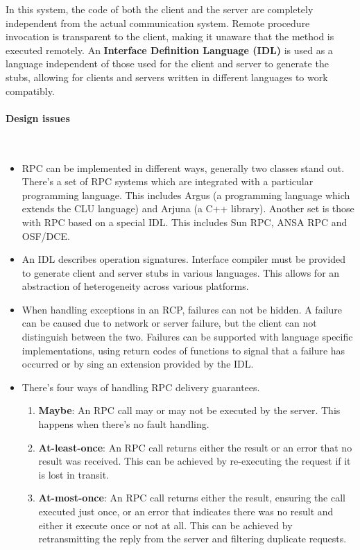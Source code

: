 \documentclass[a4paper]{article}
\newcommand{\subsubsubsection}[1]{\paragraph{#1}\mbox{}\\}
\begin{document}
In this system, the code of both the client and the server are completely independent from the actual communication system. Remote procedure invocation is transparent to the client, making it unaware that the method is executed remotely. An \textbf{Interface Definition Language (IDL)} is used as a language independent of those used for the client and server to generate the stubs, allowing for clients and servers written in different languages to work compatibly.

\subsubsubsection{Design issues}

\label{sec:delivery_guarantees}

\begin{itemize}
\item RPC can be implemented in different ways, generally two classes stand out. There's a set of RPC systems which are integrated with a particular programming language. This includes Argus (a programming language which extends the CLU language) and Arjuna (a C++ library). Another set is those with RPC based on a special IDL. This includes Sun RPC, ANSA RPC and OSF/DCE.
\item An IDL describes operation signatures. Interface compiler must be provided to generate client and server stubs in various languages. This allows for an abstraction of heterogeneity across various platforms.
\item When handling exceptions in an RCP, failures can not be hidden. A failure can be caused due to network or server failure, but the client can not distinguish between the two. Failures can be supported with language specific implementations, using return codes of functions to signal that a failure has occurred or by sing an extension provided by the IDL.
\item There's four ways of handling RPC delivery guarantees.
\begin{enumerate}
\item \textbf{Maybe}: An RPC call may or may not be executed by the server. This happens when there's no fault handling.
\item \textbf{At-least-once}: An RPC call returns either the result or an error that no result was received. This can be achieved by re-executing the request if it is lost in transit.
\item \textbf{At-most-once}: An RPC call returns either the result, ensuring the call executed just once, or an error that indicates there was no result and either it execute once or not at all. This can be achieved by retransmitting the reply from the server and filtering duplicate requests.

\end{enumerate}
\end{itemize}
\end{document}
